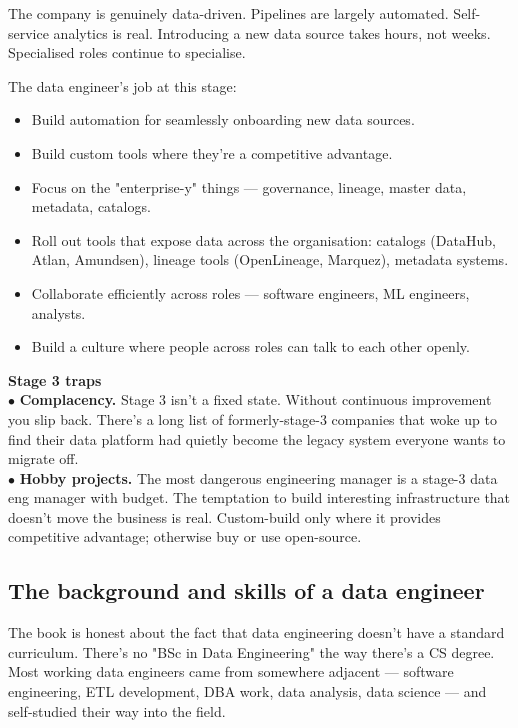The company is genuinely data-driven. Pipelines are largely automated. Self-service analytics is real. Introducing a new data source takes hours, not weeks. Specialised roles continue to specialise.

The data engineer's job at this stage:
\begin{itemize}[leftmargin=*]
  \item Build automation for seamlessly onboarding new data sources.
  \item Build custom tools where they're a competitive advantage.
  \item Focus on the "enterprise-y" things — governance, lineage, master data, metadata, catalogs.
  \item Roll out tools that expose data across the organisation: catalogs (DataHub, Atlan, Amundsen), lineage tools (OpenLineage, Marquez), metadata systems.
  \item Collaborate efficiently across roles — software engineers, ML engineers, analysts.
  \item Build a culture where people across roles can talk to each other openly.
\end{itemize}

\begin{warnbox}
\textbf{Stage 3 traps}\\
$\bullet$ \textbf{Complacency.} Stage 3 isn't a fixed state. Without continuous improvement you slip back. There's a long list of formerly-stage-3 companies that woke up to find their data platform had quietly become the legacy system everyone wants to migrate off.\\
$\bullet$ \textbf{Hobby projects.} The most dangerous engineering manager is a stage-3 data eng manager with budget. The temptation to build interesting infrastructure that doesn't move the business is real. Custom-build only where it provides competitive advantage; otherwise buy or use open-source.
\end{warnbox}

\subsection{The background and skills of a data engineer}

The book is honest about the fact that data engineering doesn't have a standard curriculum. There's no "BSc in Data Engineering" the way there's a CS degree. Most working data engineers came from somewhere adjacent — software engineering, ETL development, DBA work, data analysis, data science — and self-studied their way into the field.

